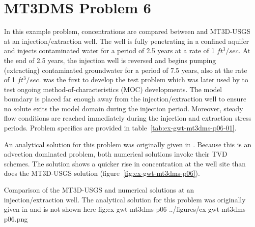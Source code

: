 \section{MT3DMS Problem 6}

In this example problem, concentrations are compared between \mf and MT3D-USGS at an injection/extraction well. The well is fully penetrating in a confined aquifer and injects contaminated water for a period of 2.5 years at a rate of 1 $ft^3/sec$.  At the end of 2.5 years, the injection well is reversed and begins pumping (extracting) contaminated groundwater for a period of 7.5 years, also at the rate of 1 $ft^3/sec$.  \cite{elkadi1988} was the first to develop the test problem which was later used by \cite{zheng1993} to test ongoing method-of-characteristics (MOC) developments.  The model boundary is placed far enough away from the injection/extraction well to ensure no solute exits the model domain during the injection period.  Moreover, steady flow conditions are reached immediately during the injection and extraction stress periods.  Problem specifics are provided in table~\ref{tab:ex-gwt-mt3dms-p06-01}.



An analytical solution for this problem was originally given in \cite{gelhar1971}.  Because this is an advection dominated problem, both numerical solutions invoke their TVD schemes.  The \mf solution shows a quicker rise in concentration at the well site than does the MT3D-USGS solution (figure~\ref{fig:ex-gwt-mt3dms-p06}). 

\begin{StandardFigure}
	{Comparison of the MT3D-USGS and \mf numerical solutions at an injection/extraction well. The analytical solution for this problem was originally given in \citep{gelhar1971} and is not shown here} 
	{fig:ex-gwt-mt3dms-p06}
	{../figures/ex-gwt-mt3dms-p06.png}
\end{StandardFigure}

